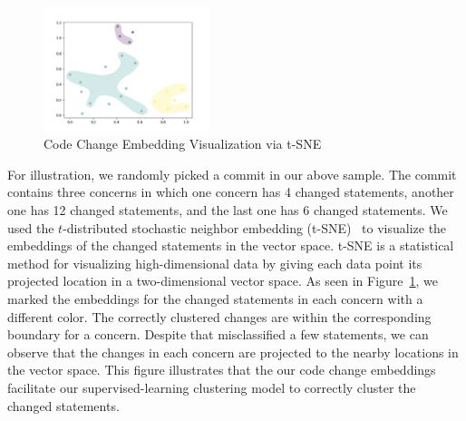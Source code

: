 
\begin{figure}[t]
	\centering
	\includegraphics[width=1.9in]{figures/RQ5.png}
	\vspace{-15pt}
	\caption{Code Change Embedding Visualization via t-SNE}
	\label{fig:vis}
\end{figure}

For illustration, we randomly picked a commit in our above
sample. The commit contains three concerns in which one concern has 4
changed statements, another one has 12 changed statements, and the
last one has 6 changed statements. We used the $t$-distributed
stochastic neighbor embedding (t-SNE)~\cite{tsne} to visualize the
embeddings of the changed statements in the vector space. t-SNE is a
statistical method for visualizing high-dimensional data by giving
each data point its projected location in a two-dimensional vector
space. As seen in Figure~\ref{fig:vis}, we marked the embeddings for
the changed statements in each concern with a different color. The
correctly clustered changes are within the corresponding boundary for
a concern. Despite that {\tool} misclassified a few statements,
we can observe that the changes in each concern are projected to the
nearby locations in the vector space. This figure illustrates that the
our code change embeddings facilitate our supervised-learning
clustering model to correctly cluster the changed statements.




